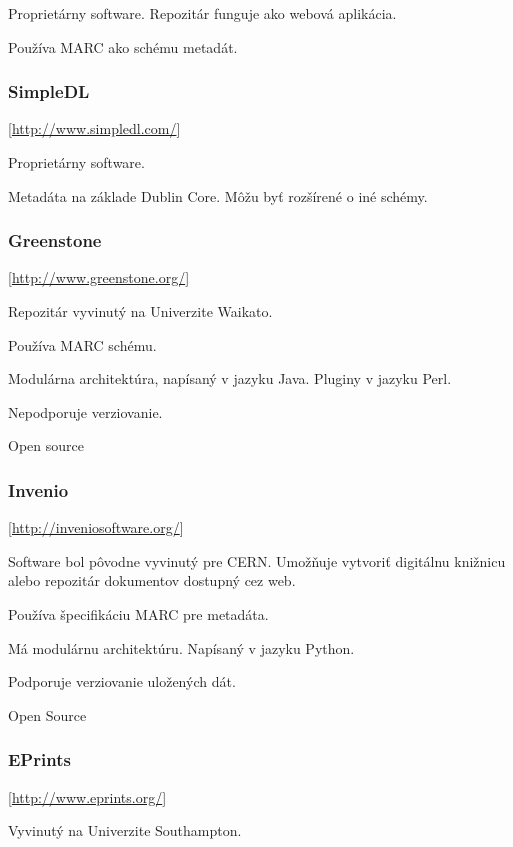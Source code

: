 \documentclass[thesis=M,slovak]{FITthesis}[2013/05/06]
\begin{document}
Proprietárny software. Repozitár funguje ako webová aplikácia.

Používa MARC ako schému metadát.

\subsubsection {SimpleDL}  [\url{http://www.simpledl.com/}]

Proprietárny software.

Metadáta na základe Dublin Core. Môžu byť rozšírené o iné schémy.

\subsubsection {Greenstone}  [\url{http://www.greenstone.org/}]

Repozitár vyvinutý na Univerzite Waikato.

Používa MARC schému.

Modulárna architektúra, napísaný v jazyku Java. Pluginy v jazyku Perl.

Nepodporuje verziovanie.

Open source

\subsubsection {Invenio}  [\url{http://inveniosoftware.org/}]

Software bol pôvodne vyvinutý pre CERN. Umožňuje vytvoriť digitálnu knižnicu alebo repozitár dokumentov dostupný cez web. 

Používa špecifikáciu MARC pre metadáta.

Má modulárnu architektúru. Napísaný v jazyku Python.

Podporuje verziovanie uložených dát.

Open Source

%

\subsubsection {EPrints} [\url{http://www.eprints.org/}]

Vyvinutý na Univerzite Southampton.
\end{document}

